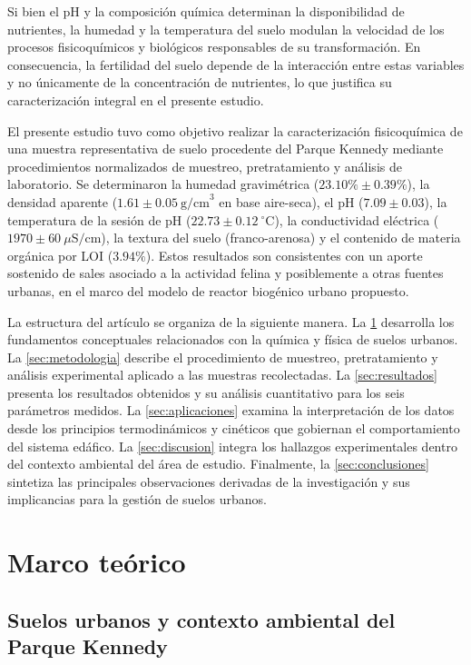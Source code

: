 \documentclass[fleqn]{jaes}
\begin{document}
Si bien el pH y la composición química determinan la disponibilidad de nutrientes, la humedad y la temperatura del suelo modulan la velocidad de los procesos fisicoquímicos y biológicos responsables de su transformación. En consecuencia, la fertilidad del suelo depende de la interacción entre estas variables y no únicamente de la concentración de nutrientes, lo que justifica su caracterización integral en el presente estudio.

El presente estudio tuvo como objetivo realizar la caracterización fisicoquímica de una muestra representativa de suelo procedente del Parque Kennedy mediante procedimientos normalizados de muestreo, pretratamiento y análisis de laboratorio. Se determinaron la humedad gravimétrica ($23.10\% \pm 0.39\%$), la densidad aparente ($1.61 \pm 0.05~\text{g/cm}^3$ en base aire-seca), el pH ($7.09 \pm 0.03$), la temperatura de la sesión de pH ($22.73 \pm 0.12~^\circ\text{C}$), la conductividad eléctrica ($1970 \pm 60~\mu\text{S/cm}$), la textura del suelo (franco-arenosa) y el contenido de materia orgánica por LOI ($3.94\%$). Estos resultados son consistentes con un aporte sostenido de sales asociado a la actividad felina y posiblemente a otras fuentes urbanas, en el marco del modelo de reactor biogénico urbano propuesto.

La estructura del artículo se organiza de la siguiente manera. La \cref{sec:marco_teorico} desarrolla los fundamentos conceptuales relacionados con la química y física de suelos urbanos. La \cref{sec:metodologia} describe el procedimiento de muestreo, pretratamiento y análisis experimental aplicado a las muestras recolectadas. La \cref{sec:resultados} presenta los resultados obtenidos y su análisis cuantitativo para los seis parámetros medidos. La \cref{sec:aplicaciones} examina la interpretación de los datos desde los principios termodinámicos y cinéticos que gobiernan el comportamiento del sistema edáfico. La \cref{sec:discusion} integra los hallazgos experimentales dentro del contexto ambiental del área de estudio. Finalmente, la \cref{sec:conclusiones} sintetiza las principales observaciones derivadas de la investigación y sus implicancias para la gestión de suelos urbanos.

\section{Marco teórico}\label{sec:marco_teorico}

\subsection{Suelos urbanos y contexto ambiental del Parque Kennedy}
\end{document}
